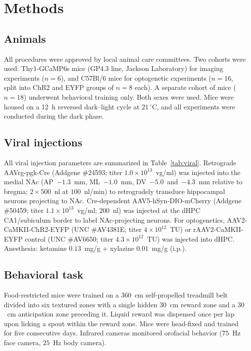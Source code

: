 \documentclass[11pt]{article}
\begin{document}
\section{Methods}

\subsection{Animals}

All procedures were approved by local animal care committees. Two cohorts were used: Thy1-GCaMP6s mice (GP4.3 line, Jackson Laboratory) for imaging experiments ($n=6$), and C57Bl/6 mice for optogenetic experiments ($n=16$, split into ChR2 and EYFP groups of $n=8$ each). A separate cohort of mice ($n=18$) underwent behavioral training only. Both sexes were used. Mice were housed on a 12~h reversed dark--light cycle at $21\,^\circ$C, and all experiments were conducted during the dark phase.

\subsection{Viral injections}

All viral injection parameters are summarized in Table~\ref{tab:viral}. Retrograde AAVrg-pgk-Cre (Addgene \#24593; titer $1.0\times10^{13}$~vg/ml) was injected into the medial NAc (AP~$-1.3$~mm, ML~$-1.0$~mm, DV~$-5.0$~and~$-4.3$~mm relative to bregma; $2 \times 500$~nl at $100$~nl/min) to retrogradely transduce hippocampal neurons projecting to NAc. Cre-dependent AAV5-hSyn-DIO-mCherry (Addgene \#50459; titer $1.1\times10^{13}$~vg/ml; $200$~nl) was injected at the dHPC CA1/subiculum border to label NAc-projecting neurons. For optogenetics, AAV2-CaMKII-ChR2-EYFP (UNC \#AV4381E; titer $4\times10^{12}$~TU) or rAAV2-CaMKII-EYFP control (UNC \#AV6650; titer $4.3\times10^{12}$~TU) was injected into dHPC. Anesthesia: ketamine $0.13$~mg/g + xylazine $0.01$~mg/g (i.p.).

\subsection{Behavioral task}

Food-restricted mice were trained on a $360$~cm self-propelled treadmill belt divided into six textured zones with a single hidden $30$~cm reward zone and a $30$~cm anticipation zone preceding it. Liquid reward was dispensed once per lap upon licking a spout within the reward zone. Mice were head-fixed and trained for five consecutive days. Infrared cameras monitored orofacial behavior ($75$~Hz face camera, $25$~Hz body camera).
\end{document}

